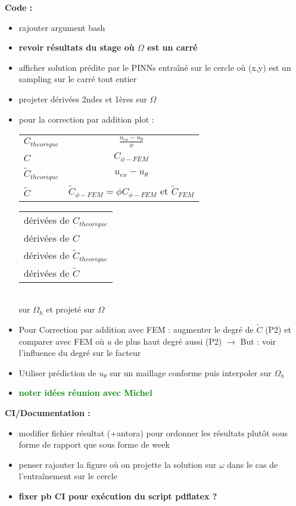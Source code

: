 \textbf{Code :}
\begin{itemize}[label=$\square$] 
	\item[\done] rajouter argument bash
	\item \textbf{revoir résultats du stage où $\Omega$ est un carré}
	\item afficher solution prédite par le PINNs entraîné sur le cercle où (x,y) est un sampling sur le carré tout entier
	\item projeter dérivées 2ndes et 1ères sur $\Omega$
	\item pour la correction par addition plot : \\
	\begin{minipage}{0.48\linewidth}
		\begin{tabular}[\linewidth]{lc}
			$C_{theorique}$ & $\frac{u_{ex}-u_\theta}{\phi}$ \\
			$C$ & $C_{\phi-FEM}$ \\
			$\tilde{C}_{theorique}$ & $u_{ex}-u_\theta$ \\
			$\tilde{C}$ & $\tilde{C}_{\phi-FEM}=\phi C_{\phi-FEM}$ et $\tilde{C}_{FEM}$
		\end{tabular}
	\end{minipage}
	\begin{minipage}{0.48\linewidth}
		\begin{tabular}[\linewidth]{l}
			dérivées de $C_{theorique}$ \\
			dérivées de $C$ \\
			dérivées de $\tilde{C}_{theorique}$ \\
			dérivées de $\tilde{C}$
		\end{tabular}
	\end{minipage} \\
	sur $\Omega_h$ et projeté sur $\Omega$
	\item Pour Correction par addition avec FEM : augmenter le degré de $\tilde{C}$ (P2) et comparer avec FEM où $u$ de plus haut degré aussi (P2) $\rightarrow$ But : voir l'influence du degré sur le facteur
	\item Utiliser prédiction de $u_\theta$ sur un maillage conforme puis interpoler sur $\Omega_h$
	\item \textbf{\textcolor{green}{noter idées réunion avec Michel}}
\end{itemize}
\textbf{CI/Documentation :}
\begin{itemize}[label=$\square$] 
	\item modifier fichier résultat (+antora) pour ordonner les résultats plutôt sous forme de rapport que sous forme de week
	\item penser rajouter la figure où on projette la solution sur $\omega$ dans le cas de l'entraînement sur le cercle
	\item \textbf{fixer pb CI pour exécution du script pdflatex ?}
\end{itemize}
